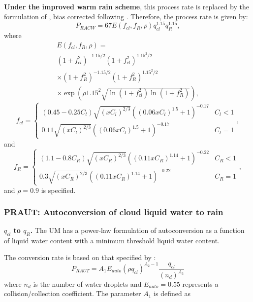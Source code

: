 \documentclass{UMDP_article}
\begin{document}
{\bf Under the improved warm rain scheme}, this process rate is
replaced by the formulation of \cite{Khair:Kogan:2000}, bias corrected
following \cite{boutle:etal:2014}. Therefore, the process rate is
given by:
\begin{equation}
  P_{RACW} = 67E(f_{cl},f_R,\rho)q_{cl}^{1.15}q_R^{1.15},
\end{equation}
where
\begin{eqnarray}
E(f_{cl},f_R,\rho)=\qquad\qquad\qquad\qquad\nonumber\\
(1+f_{cl}^2)^{-1.15/2}(1+f_{cl}^2)^{1.15^2/2}\nonumber\\
\times (1+f_R^2)^{-1.15/2}(1+f_R^2)^{1.15^2/2}\nonumber\\
\times \exp\left(\rho 1.15^2 \sqrt{\ln(1+f_{cl}^2)\ln(1+f_R^2)}\right),
\end{eqnarray}
\begin{equation}\label{eq-fsdqcl}
  f_{cl}=\left\{ \begin{array}{ll}
      (0.45-0.25C_l)\sqrt{(xC_l)^{2/3}}((0.06xC_l)^{1.5}+1)^{-0.17}&C_l<1 \\
      0.11\sqrt{(xC_l)^{2/3}}((0.06xC_l)^{1.5}+1)^{-0.17}&C_l=1
    \end{array},\right.
\end{equation}
and
\begin{equation}\label{eq-fsdqr}
  f_R=\left\{ \begin{array}{ll}
      (1.1-0.8C_R)\sqrt{(xC_R)^{2/3}}((0.11xC_R)^{1.14}+1)^{-0.22}&C_R<1 \\
      0.3\sqrt{(xC_R)^{2/3}}((0.11xC_R)^{1.14}+1)^{-0.22}&C_R=1
    \end{array},\right.
\end{equation}
and $\rho=0.9$ is specified.

\subsubsection{PRAUT:  Autoconversion of cloud liquid water to rain}
\label{sec:PRAUT}

\textbf{$q_{cl}$ to $q_{R}$.}
The UM has a power-law formulation of autoconversion as a function of liquid
water content with a minimum threshold liquid water content.

The conversion rate is based on that specified by \cite{Tripoli:Cotton:1980}:
\begin{equation}
P_{RAUT}=A_1 E_{auto} (\rho q_{cl})^{A_2-1} \frac{q_{cl}}{ (n_d)^{A_3}}	
\end{equation}
where $n_d$ is the number of water droplets and $E_{auto}=0.55$ represents a
collision/collection coefficient.
The parameter $A_1$ is defined as
\end{document}
